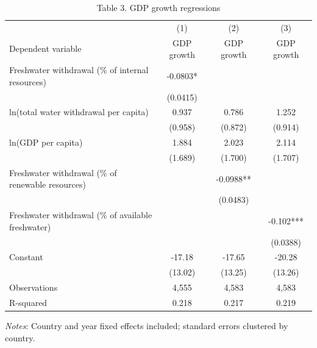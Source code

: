 \begin{table}[htbp]
\centering
\caption{Table 3. GDP growth regressions}
\small
\begin{tabular}{lccc}
\hline
 & (1) & (2) & (3) \\
Dependent variable & GDP growth & GDP growth & GDP growth \\
\hline
Freshwater withdrawal (\% of internal resources) & -0.0803* &  &  \\
 & (0.0415) &  &  \\
ln(total water withdrawal per capita) & 0.937 & 0.786 & 1.252 \\
 & (0.958) & (0.872) & (0.914) \\
ln(GDP per capita) & 1.884 & 2.023 & 2.114 \\
 & (1.689) & (1.700) & (1.707) \\
Freshwater withdrawal (\% of renewable resources) &  & -0.0988** &  \\
 &  & (0.0483) &  \\
Freshwater withdrawal (\% of available freshwater) &  &  & -0.102*** \\
 &  &  & (0.0388) \\
Constant & -17.18 & -17.65 & -20.28 \\
 & (13.02) & (13.25) & (13.26) \\
\hline
Observations & 4,555 & 4,583 & 4,583 \\
R-squared & 0.218 & 0.217 & 0.219 \\
\hline
\end{tabular}
\vspace{0.5em}
\parbox{0.95\textwidth}{\footnotesize \textit{Notes}: Country and year fixed effects included; standard errors clustered by country.}
\end{table}
